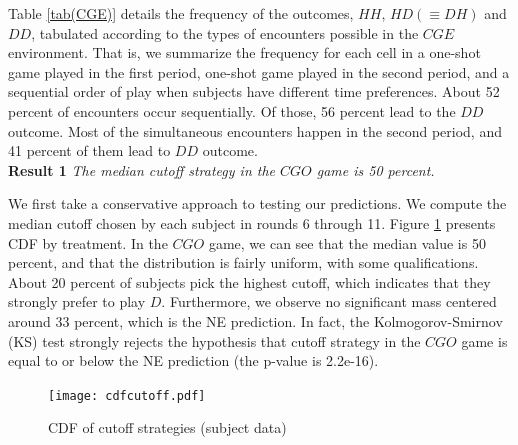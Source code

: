 \documentclass[11pt, letterpaper]{article}
\theoremstyle{plain}
\begin{document}
Table \ref{tab(CGE)} details the frequency of the outcomes, $HH$, $HD(\equiv DH)$ and $DD$, tabulated according to the types of encounters possible in the $CGE$ environment. That is, we summarize the frequency for each cell in a one-shot game played in the first period, one-shot game played in the second period, and a sequential order of play when subjects have different time preferences. About 52 percent of encounters occur sequentially. Of those, 56 percent lead to the $DD$ outcome. Most of the simultaneous encounters happen in the second period, and 41 percent of them lead to $DD$ outcome.  \\


\noindent \textbf{Result 1}
\textit{The median cutoff strategy in the $CGO$ game is 50 percent.}

We first take a conservative approach to testing our predictions. We compute the median cutoff chosen by each subject in rounds 6 through 11. Figure  \ref{fig:allcutoff} presents CDF by treatment. In the $CGO$ game, we can see that the median value is 50 percent, and that the distribution is fairly uniform, with some qualifications. About 20 percent of subjects pick the highest cutoff, which indicates that they strongly prefer to play $D$. Furthermore, we observe no significant mass centered around 33 percent, which is the NE prediction. In fact, the Kolmogorov-Smirnov (KS) test strongly rejects the hypothesis that cutoff strategy in the $CGO$ game is equal to or below the NE prediction (the p-value is 2.2e-16).


\begin{center}
\begin{figure}[ht]
\centering{}%
\texttt{[image: cdfcutoff.pdf]}%
\caption{CDF of cutoff strategies (subject data) \\ } 
\label{fig:allcutoff}
\end{figure}
\par\end{center}
\end{document}

